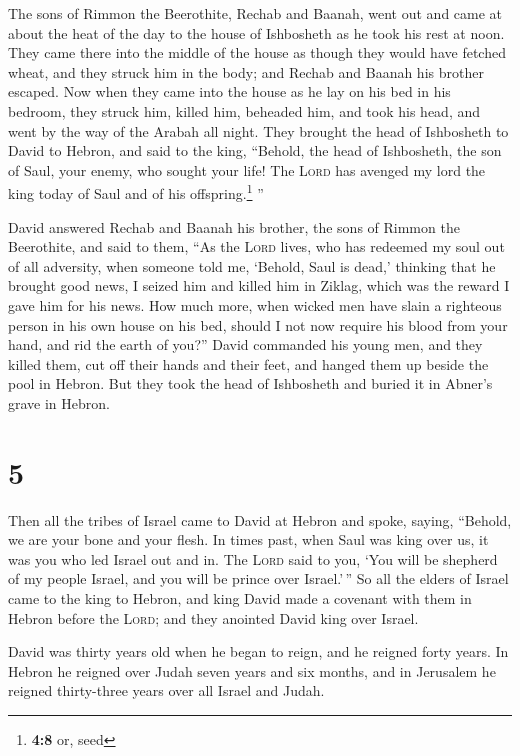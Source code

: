  The sons of Rimmon the Beerothite, Rechab and Baanah,
went out and came at about the heat of the day to the house of
Ishbosheth as he took his rest at noon.  They came there
into the middle of the house as though they would have fetched wheat,
and they struck him in the body; and Rechab and Baanah his brother
escaped.  Now when they came into the house as he lay on
his bed in his bedroom, they struck him, killed him, beheaded him, and
took his head, and went by the way of the Arabah all night.
 They brought the head of Ishbosheth to David to Hebron,
and said to the king, ``Behold, the head of Ishbosheth, the son of Saul,
your enemy, who sought your life! The \textsc{Lord} has avenged my lord
the king today of Saul and of his offspring.\footnote{\textbf{4:8} or,
  seed} ''

 David answered Rechab and Baanah his brother, the sons of
Rimmon the Beerothite, and said to them, ``As the \textsc{Lord} lives,
who has redeemed my soul out of all adversity,  when
someone told me, `Behold, Saul is dead,' thinking that he brought good
news, I seized him and killed him in Ziklag, which was the reward I gave
him for his news.  How much more, when wicked men have
slain a righteous person in his own house on his bed, should I not now
require his blood from your hand, and rid the earth of you?''
 David commanded his young men, and they killed them, cut
off their hands and their feet, and hanged them up beside the pool in
Hebron. But they took the head of Ishbosheth and buried it in Abner's
grave in Hebron.

\hypertarget{section-4}{%
\section{5}\label{section-4}}

 Then all the tribes of Israel came to David at Hebron and
spoke, saying, ``Behold, we are your bone and your flesh. 
In times past, when Saul was king over us, it was you who led Israel out
and in. The \textsc{Lord} said to you, `You will be shepherd of my
people Israel, and you will be prince over Israel.'\,'' 
So all the elders of Israel came to the king to Hebron, and king David
made a covenant with them in Hebron before the \textsc{Lord}; and they
anointed David king over Israel.

 David was thirty years old when he began to reign, and he
reigned forty years.  In Hebron he reigned over Judah
seven years and six months, and in Jerusalem he reigned thirty-three
years over all Israel and Judah.

